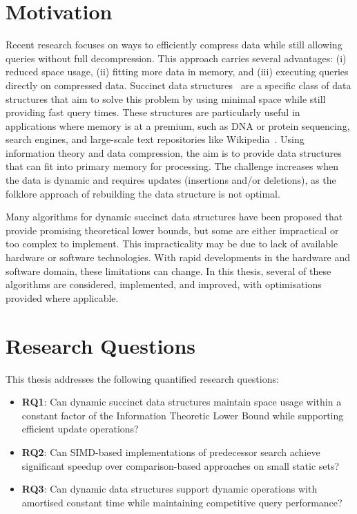 \section{Motivation}
Recent research focuses on ways to efficiently compress data while still allowing queries without full decompression. This approach carries several advantages: (i) reduced space usage, (ii) fitting more data in memory, and (iii) executing queries directly on compressed data. Succinct data structures~\cite{Jacobson_1989} are a specific class of data structures that aim to solve this problem by using minimal space while still providing fast query times. These structures are particularly useful in applications where memory is at a premium, such as DNA or protein sequencing, search engines, and large-scale text repositories like Wikipedia~\cite{Pibiri_2017}. Using information theory and data compression, the aim is to provide data structures that can fit into primary memory for processing. The challenge increases when the data is dynamic and requires updates (insertions and/or deletions), as the folklore approach of rebuilding the data structure is not optimal.

Many algorithms for dynamic succinct data structures have been proposed that provide promising theoretical lower bounds, but some are either impractical or too complex to implement. This impracticality may be due to lack of available hardware or software technologies. With rapid developments in the hardware and software domain, these limitations can change. In this thesis, several of these algorithms are considered, implemented, and improved, with optimisations provided where applicable.

\section{Research Questions}

This thesis addresses the following quantified research questions:

\begin{itemize}
    \item \textbf{RQ1}: Can dynamic succinct data structures maintain space usage within a constant factor of the Information Theoretic Lower Bound while supporting efficient update operations?

    \item \textbf{RQ2}: Can SIMD-based implementations of predecessor search achieve significant speedup over comparison-based approaches on small static sets?

    \item \textbf{RQ3}: Can dynamic data structures support dynamic operations with amortised constant time while maintaining competitive query performance?
\end{itemize}

